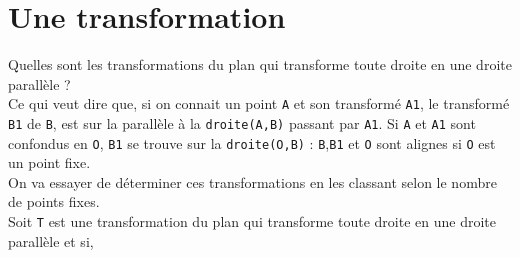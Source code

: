 \documentclass[a4paper,11pt]{book}
\begin{document}
\section{Une transformation}
Quelles sont les transformations du plan qui transforme toute droite en une 
droite parall\`ele ?\\
Ce qui veut dire que, si on connait un point {\tt A} et son transform\'e 
{\tt A1}, le transform\'e  {\tt B1} de {\tt B}, est sur la parall\`ele \`a la 
{\tt droite(A,B)} passant par {\tt A1}.
Si  {\tt A}  et {\tt A1} sont confondus en {\tt O}, {\tt B1} se trouve sur la 
{\tt droite(O,B)} : {\tt B},{\tt B1} et {\tt O}  sont alignes si {\tt O}
est un point fixe.\\
On va essayer de d\'eterminer ces transformations en les classant selon le
nombre de points fixes.\\
Soit {\tt T} est une transformation du plan qui transforme toute droite en une 
droite parall\`ele et si, 
\end{document}
